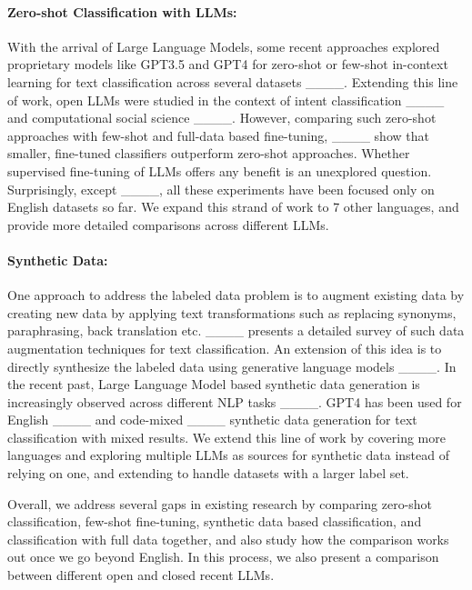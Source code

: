 \paragraph{Zero-shot Classification with LLMs: }With the arrival of Large Language Models, some recent approaches explored proprietary models like GPT3.5 and GPT4 for zero-shot or few-shot in-context learning for text classification across several datasets ____. Extending this line of work, open LLMs were studied in the context of intent classification ____ and computational social science ____. However, comparing such zero-shot approaches with few-shot and full-data  based fine-tuning, ____ show that smaller, fine-tuned classifiers outperform zero-shot approaches. Whether supervised fine-tuning of LLMs offers any benefit is an unexplored question. Surprisingly, except ____, all these experiments have been focused only on English datasets so far. We expand this strand of work to 7 other languages, and provide more detailed comparisons across different LLMs. 

\paragraph{Synthetic Data: } One approach to address the labeled data problem is to augment existing data by creating new data by applying text transformations such as replacing synonyms, paraphrasing, back translation etc. ____ presents a detailed survey of such data augmentation techniques for text classification. An extension of this idea is to directly synthesize the labeled data using generative language models ____. In the recent past, Large Language Model based synthetic data generation is increasingly observed across different NLP tasks ____. GPT4 has been used for English ____ and code-mixed ____ synthetic data generation for text classification with mixed results. We extend this line of work by covering more languages and exploring multiple LLMs as sources for synthetic data instead of relying on one, and extending to handle datasets with a larger label set. 

Overall, we address several gaps in existing research by comparing zero-shot classification, few-shot fine-tuning, synthetic data based classification, and classification with full data together, and also study how the comparison works out once we go beyond English. In this process, we also present a comparison between different open and closed recent LLMs.